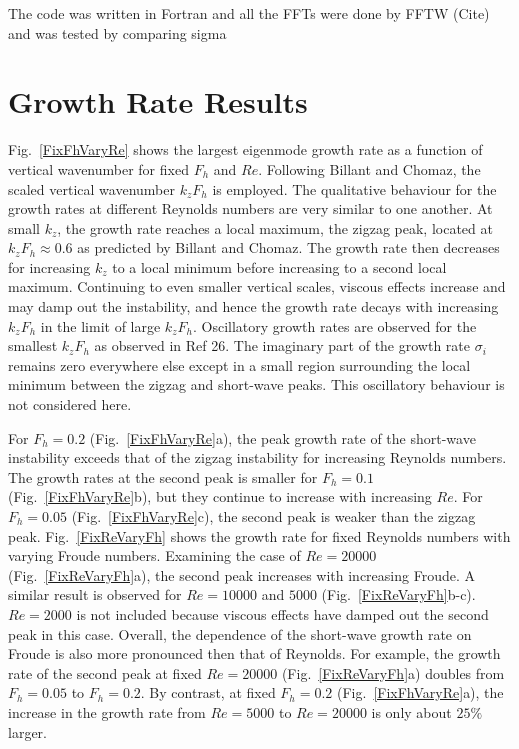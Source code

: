 The code was written in Fortran and all the FFTs were done by FFTW (Cite) and was tested by comparing sigma 

\section{Growth Rate Results}
Fig.~\ref{FixFhVaryRe} shows the largest eigenmode growth rate as a function of vertical wavenumber for fixed $F_{h}$ and $Re$. Following Billant and Chomaz\cite{bc2000c}, the scaled vertical wavenumber $k_{z}F_{h}$ is employed. The qualitative behaviour for the growth rates at different Reynolds numbers are very similar to one another. At small $k_{z}$, the growth rate reaches a local maximum, the zigzag peak, located at $k_{z}F_{h}\approx 0.6$ as predicted by Billant and Chomaz\cite{bc2000c}.  The growth rate then decreases for increasing $k_{z}$ to a local minimum before increasing to a second local maximum. Continuing to even smaller vertical scales, viscous effects increase and may damp out the instability, and hence the growth rate decays with increasing $k_{z}F_{h}$ in the limit of large $k_{z}F_{h}$. Oscillatory growth rates are observed for the smallest $k_{z}F_{h}$ as observed in Ref 26\nocite{bc1999}. The imaginary part of the growth rate $\sigma_{i}$ remains zero everywhere else except in a small region surrounding the local minimum between the zigzag and short-wave peaks. This oscillatory behaviour is not considered here. 

For $F_{h}=0.2$ (Fig.~\ref{FixFhVaryRe}a), the peak growth rate of the short-wave instability exceeds that of the zigzag instability for increasing Reynolds numbers. The growth rates at the second peak is smaller for $F_{h}=0.1$ (Fig.~\ref{FixFhVaryRe}b), but they continue to increase with increasing $Re$. For $F_{h}=0.05$ (Fig.~\ref{FixFhVaryRe}c), the second peak is weaker than the zigzag peak. Fig.~\ref{FixReVaryFh} shows the growth rate for fixed Reynolds numbers with varying Froude numbers. Examining the case of $Re=20000$ (Fig.~\ref{FixReVaryFh}a), the second peak increases with increasing Froude. A similar result is observed for $Re=10000$ and $5000$ (Fig.~\ref{FixReVaryFh}b-c). $Re=2000$ is not included because viscous effects have damped out the second peak in this case. Overall, the dependence of the short-wave growth rate on Froude is also more pronounced then that of Reynolds. For example, the growth rate of the second peak at fixed $Re=20000$ (Fig.~\ref{FixReVaryFh}a) doubles from $F_{h}=0.05$ to $F_{h}=0.2$. By contrast, at fixed $F_{h}=0.2$ (Fig.~\ref{FixFhVaryRe}a), the increase in the growth rate from $Re=5000$ to $Re=20000$ is only about $25\%$ larger. 

